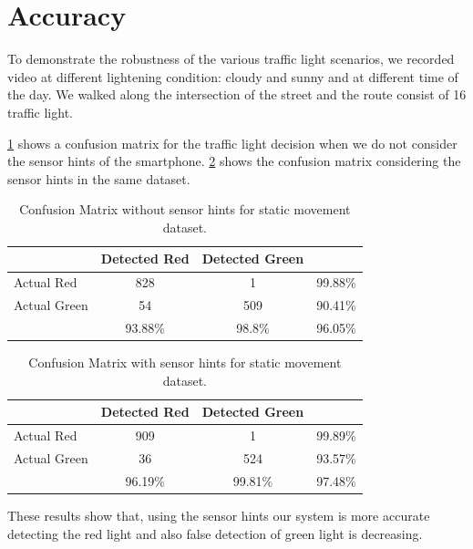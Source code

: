 \section{Accuracy}
\label{s:acc}
To demonstrate the robustness of the various traffic light scenarios, we recorded video at different lightening condition: cloudy and sunny and at different time of the day.
We walked along the intersection of the street and the route consist of 16 traffic light.

\ref{t:con_nocrp} shows a confusion matrix for the traffic light decision when we do not consider the sensor hints of the smartphone.
\ref{t:con_crp} shows the confusion matrix considering the sensor hints in the same dataset.

\begin{table}[h!]
  \centering
  \caption{Confusion Matrix without sensor hints for static movement dataset.}
  \label{t:con_nocrp}
  \begin{tabular}{  l | c | c | r }
   
     & Detected Red & Detected Green &  \\
    \hline
    Actual Red & 828 & 1 & 99.88\% \\
    \hline
    Actual Green & 54 & 509 & 90.41\% \\
    \hline
    & 93.88\% & 98.8\% & 96.05\% \\
    
  \end{tabular}
\end{table}

\begin{table}[h!]
  \centering
  \caption{Confusion Matrix with sensor hints for static movement dataset.}
  \label{t:con_crp}
  \begin{tabular}{  l | c | c | r }
   
     & Detected Red & Detected Green &  \\
    \hline
    Actual Red & 909 & 1 & 99.89\% \\
    \hline
    Actual Green & 36 & 524 & 93.57\% \\
    \hline
    & 96.19\% & 99.81\% & 97.48\% \\
    
  \end{tabular}
\end{table}

These results show that, using the sensor hints our system is more accurate detecting the red light and also false detection of green light is decreasing.

